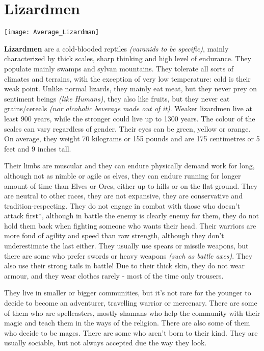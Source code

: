 \section{Lizardmen}


\texttt{[image: Average\_Lizardman]}


\textbf{Lizardmen} are a cold-blooded reptiles \textit{(varanids to be specific)}, mainly characterized by thick scales, sharp thinking and high level of endurance. They populate mainly swamps and sylvan mountains. They tolerate all sorts of climates and terrains, with the exception of very low temperature: cold is their weak point. Unlike normal lizards, they mainly eat meat, but they never prey on sentiment beings \textit{(like Humans)}, they also like fruits, but they never eat grains/cereals \textit{(nor alcoholic beverage made out of it)}. Weaker lizardmen live at least 900 years, while the stronger could live up to 1300 years. The colour of the scales can vary regardless of gender. Their eyes can be green, yellow or orange. On average, they weight 70 kilograms or 155 pounds and are 175 centimetres or 5 feet and 9 inches tall.


Their limbs are muscular and they can endure physically demand work for long, although not as nimble or agile as elves, they can endure running for longer amount of time than Elves or Orcs, either up to hills or on the flat ground. They are neutral to other races, they are not expansive, they are conservative and tradition-respecting. They do not engage in combat with those who doesn't attack first*, although in battle the enemy is clearly enemy for them, they do not hold them back when fighting someone who wants their head. Their warriors are more fond of agility and speed than raw strength, although they don’t underestimate the last either. They usually use spears or missile weapons, but there are some who prefer swords or heavy weapons \textit{(such as battle axes)}. They also use their strong tails in battle! Due to their thick skin, they do not wear armour, and they wear clothes rarely - most of the time only trousers.


They live in smaller or bigger communities, but it’s not rare for the younger to decide to become an adventurer, travelling warrior or mercenary. There are some of them who are spellcasters, mostly shamans who help the community with their magic and teach them in the ways of the religion. There are also some of them who decide to be mages. There are some who aren’t born to their kind. They are usually sociable, but not always accepted due the way they look.


